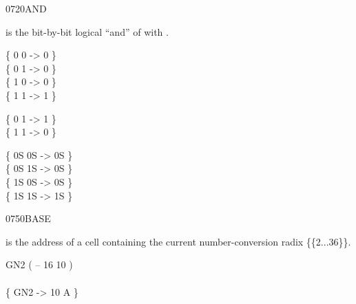 \begin{worddef}{0720}{AND}
\item {}

	 is the bit-by-bit logical ``and'' of 
	with .

	\begin{defer}
	\testing
		\{ 0 0  -> 0 \} \\
		\{ 0 1  -> 0 \} \\
		\{ 1 0  -> 0 \} \\
		\{ 1 1  -> 1 \}

		\{ 0  1  -> 1 \} \\
		\{ 1  1  -> 0 \}

		\{ 0S 0S  -> 0S \} \\
		\{ 0S 1S  -> 0S \} \\
		\{ 1S 0S  -> 0S \} \\
		\{ 1S 1S  -> 1S \}
	\end{defer}
\end{worddef}


\begin{worddef}{0750}{BASE}
\item {}

	 is the address of a cell containing the current
	number-conversion radix \{\{2...36\}\}.

	\begin{defer}
	\testing
		\word{:} GN2	 ( -- 16 10 ) \\
		\tab {}  \word{toR}
			  \word{@}
			  \word{@}
			  \word{!} \word{;} \\
		\{ GN2 -> 10 A \}
	\end{defer}
\end{worddef}


